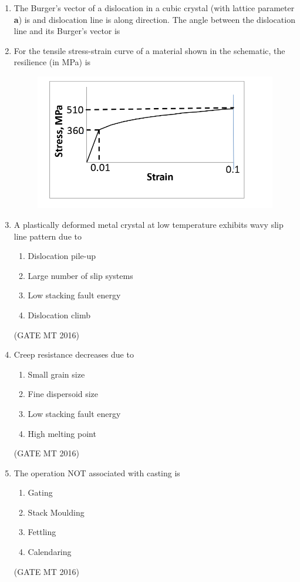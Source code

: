 \documentclass[journal, 11pt, onecolumn]{IEEEtran}
\theoremstyle{remark}
\begin{document}
\begin{enumerate}
\item The Burger's vector of a dislocation in a cubic crystal (with lattice parameter \textbf{a}) is  and dislocation line is along  direction. The angle  between the dislocation line and its Burger's vector is

\item For the tensile stress-strain curve of a material shown in the schematic, the resilience (in MPa) is

\begin{figure}[H]
    \centering
    \includegraphics[width=0.5\linewidth]{figs/image3'.png}
    \caption{}
    \label{fig:placeholder}
\end{figure}

\item A plastically deformed metal crystal at low temperature exhibits wavy slip line pattern due
to
\begin{multicols}{2}
\begin{enumerate}
\item Dislocation pile-up
\item Large number of slip systems
\item Low stacking fault energy
\item Dislocation climb
\end{enumerate}
\end{multicols}
\hfill(GATE MT 2016)

\item Creep resistance decreases due to
\begin{multicols}{2}
\begin{enumerate}
\item Small grain size
\item Fine dispersoid size
\item Low stacking fault energy
\item High melting point
\end{enumerate}
\end{multicols}
\hfill(GATE MT 2016)

\item The operation NOT associated with casting is
\begin{multicols}{2}
\begin{enumerate}
\item Gating
\item Stack Moulding
\item Fettling
\item Calendaring
\end{enumerate}
\end{multicols}
\hfill(GATE MT 2016)


\end{enumerate}
\end{document}
